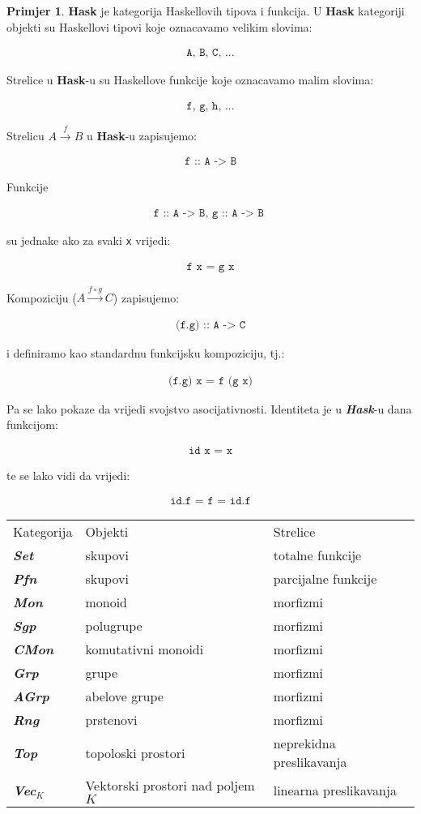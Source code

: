 \documentclass[11pt]{article}
\newcommand{\bold}[1]{\textbf{#1}}
\newcommand{\category}[1]{\bold{\emph{#1}}}
\newcommand{\code}[1]{
  \begin{align*}
    \texttt{#1}
  \end{align*}
  }
\theoremstyle{definition}
\newtheorem{primjer}{Primjer}
\begin{document}
  \begin{primjer} \textbf{Hask} je kategorija Haskellovih tipova i funkcija. U
  \textbf{Hask} kategoriji objekti su Haskellovi tipovi koje oznacavamo velikim
  slovima:
    \code{A, B, C, ...}
  Strelice u \textbf{Hask}-u su Haskellove funkcije koje oznacavamo malim
  slovima:
    \code{f, g, h, ...}
  Strelicu $A \xrightarrow{f} B$ u \textbf{Hask}-u zapisujemo:
    \code{f :: A -> B}
  Funkcije
    \code{
      f :: A -> B, g :: A -> B
      }
  su jednake ako za svaki \texttt{x} vrijedi:
    \code{ f x = g x }
  Kompoziciju ($A \xrightarrow{f \circ g} C$) zapisujemo:
    \code{(f.g) :: A -> C}
    i definiramo kao standardnu funkcijsku kompoziciju, tj.:
    \code{(f.g) x = f (g x)}
  Pa se lako pokaze da vrijedi svojstvo asocijativnosti.
  Identiteta je u \category{Hask}-u dana funkcijom:
    \code{ id x = x }
  te se lako vidi da vrijedi:
    \code{ id.f = f = id.f }
  \end{primjer}

  \begin{center}
  \begin{longtabu}{l l l}  \vspace{1em}
    Kategorija & Objekti & Strelice \\
      \category{Set} & skupovi & totalne funkcije \\
      \category{Pfn} & skupovi & parcijalne funkcije \\
      \category{Mon} & monoid & morfizmi \\
      \category{Sgp} & polugrupe & morfizmi \\
      \category{CMon} & komutativni monoidi & morfizmi \\
      \category{Grp} & grupe & morfizmi \\
      \category{AGrp} & abelove grupe & morfizmi \\
      \category{Rng} & prstenovi & morfizmi \\
      \category{Top} & topoloski prostori & neprekidna preslikavanja \\
      \category{Vec$_K$} & Vektorski prostori nad poljem $K$& linearna preslikavanja \\

    \end{longtabu}
  \end{center}
\end{document}
